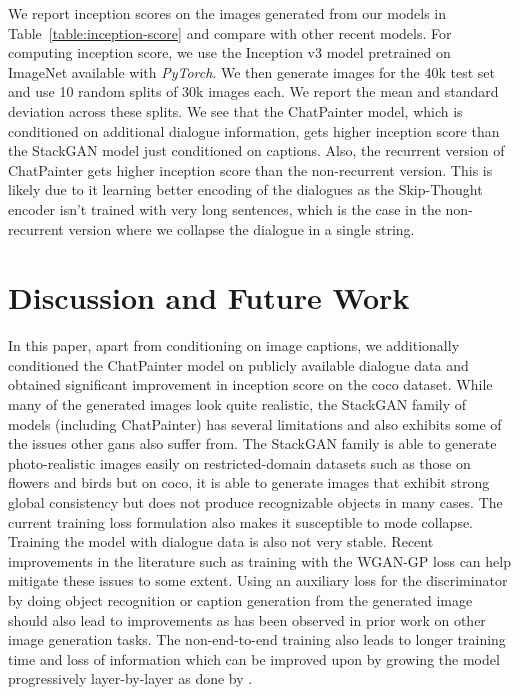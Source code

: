 \documentclass{article}
\begin{document}
We report inception scores on the images generated from our models in Table~\ref{table:inception-score} and compare with other recent models. For computing inception score, we use the Inception v3 model pretrained on ImageNet available with \textit{PyTorch}. We then generate images for the 40k test set and use 10 random splits of 30k images each. We report the mean and standard deviation across these splits. We see that the ChatPainter model, which is conditioned on additional dialogue information, gets higher inception score than the StackGAN model just conditioned on captions. Also, the recurrent version of ChatPainter gets higher inception score than the non-recurrent version. This is likely due to it learning better encoding of the dialogues as the Skip-Thought encoder isn't trained with very long sentences, which is the case in the non-recurrent version where we collapse the dialogue in a single string.


\section{Discussion and Future Work}
In this paper, apart from conditioning on image captions, we additionally conditioned the ChatPainter model on publicly available dialogue data and obtained significant improvement in inception score on the \gls{coco} dataset. While many of the generated  images look quite realistic, the StackGAN family of models (including ChatPainter) has several limitations and also exhibits some of the issues other \glspl{gan} also suffer from. The StackGAN family is able to generate photo-realistic images easily on restricted-domain datasets such as those on flowers and birds but on \gls{coco}, it is able to generate images that exhibit strong global consistency but does not produce recognizable objects in many cases. The current training loss formulation also makes it susceptible to mode collapse. Training the model with dialogue data is also not very stable. Recent improvements in the literature such as training with the WGAN-GP loss can help mitigate these issues to some extent. Using an auxiliary loss for the discriminator by doing object recognition or caption generation from the generated image should also lead to improvements as has been observed in prior work on other image generation tasks. The non-end-to-end training also leads to longer training time and loss of information which can be improved upon by growing the model progressively layer-by-layer as done by \citet{karras2018progressive}.
\end{document}
